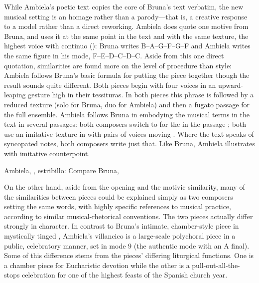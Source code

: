 While Ambiela's poetic text copies the core of Bruna's text verbatim, the new
musical setting is an homage rather than a parody---that is, a creative
response to a model rather than a direct reworking.
Ambiela does quote one motive from Bruna, and uses it at the same point in the
text and with the same texture, the highest voice with continuo
(): Bruna writes
B\fl--A--G--F\sh--G--F\sh{} and Ambiela writes the same figure in his mode,
F--E--D--C\sh--D--C\sh.
Aside from this one direct quotation, similarities are found more on the level
of procedure than style: Ambiela follows Bruna's basic formula for putting the
piece together though the result sounds quite different.
Both pieces begin with four voices in an upward-leaping gesture high in their
tessituras.  
In both pieces this phrase is followed by a reduced texture (solo for Bruna,
duo for Ambiela) and then a fugato passage for the full ensemble.
Ambiela follows Bruna in embodying the musical terms in the text in several
passages: both composers switch to \meterC{} for the  in the
passage ; both use an imitative texture in
 with pairs of voices moving .
Where the text speaks of syncopated notes, both composers write just that.
Like Bruna, Ambiela illustrates  with imitative counterpoint.

{Ambiela, , estribillo: Compare Bruna,
}

On the other hand, aside from the opening and the motivic similarity, many of
the similarities between pieces could be explained simply as two composers
setting the same words, with highly specific references to musical practice,
according to similar musical-rhetorical conventions.
The two pieces actually differ strongly in character.
In contrast to Bruna's intimate, chamber-style piece in mystically tinged
, Ambiela's villancico is a large-scale polychoral piece in
a public, celebratory manner, set in mode 9 (the authentic mode with an A
final).
Some of this difference stems from the pieces' differing liturgical functions. 
One is a chamber piece for Eucharistic devotion while the other is a
pull-out-all-the-stops celebration for one of the highest feasts of the Spanish
church year.

